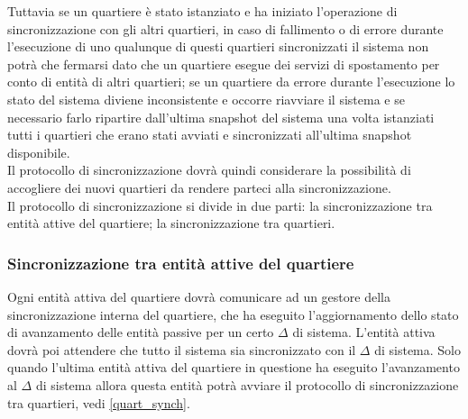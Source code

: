 Tuttavia se un quartiere è stato istanziato e ha iniziato l'operazione di sincronizzazione con gli altri quartieri, in caso di fallimento o di errore durante l'esecuzione di uno qualunque di questi quartieri sincronizzati il sistema non potrà che fermarsi dato che un quartiere esegue dei servizi di spostamento per conto di entità di altri quartieri; se un quartiere da errore durante l'esecuzione lo stato del sistema diviene inconsistente e occorre riavviare il sistema e se necessario farlo ripartire dall'ultima snapshot del sistema una volta istanziati tutti i quartieri che erano stati avviati e sincronizzati all'ultima snapshot disponibile.\\
Il protocollo di sincronizzazione dovrà quindi considerare la possibilità di accogliere dei nuovi quartieri da rendere parteci alla sincronizzazione.\\
Il protocollo di sincronizzazione si divide in due parti: la sincronizzazione tra entità attive del quartiere; la sincronizzazione tra quartieri.
\subsubsection{Sincronizzazione tra entità attive del quartiere}
\label{int_synch}
Ogni entità attiva del quartiere dovrà comunicare ad un gestore della sincronizzazione interna del quartiere, che ha eseguito l'aggiornamento dello stato di avanzamento delle entità passive per un certo $\Delta$ di sistema. L'entità attiva dovrà poi attendere che tutto il sistema sia sincronizzato con il $\Delta$ di sistema. Solo quando l'ultima entità attiva del quartiere in questione ha eseguito l'avanzamento al $\Delta$ di sistema allora questa entità potrà avviare il protocollo di sincronizzazione tra quartieri, vedi \ref{quart_synch}.

